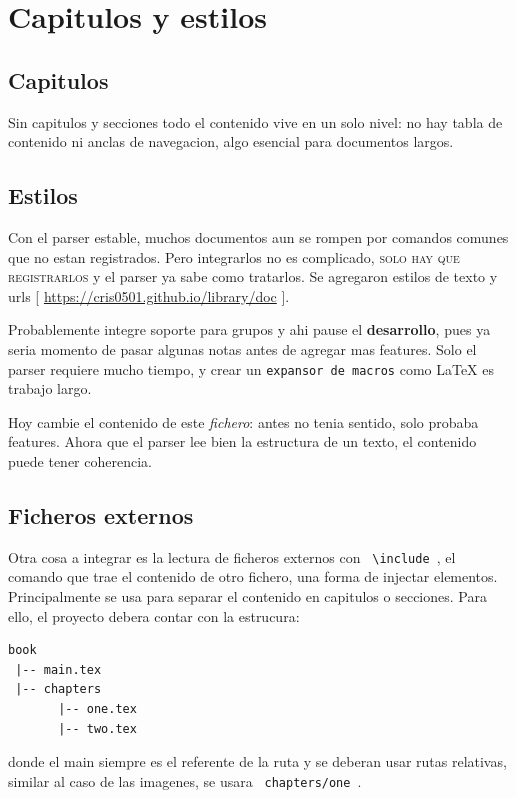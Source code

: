 \documentclass{article}
\begin{document}
  \chapter{ Capitulos y estilos }

  \section{ Capitulos }

  Sin capitulos y secciones todo el contenido vive en un solo nivel: no hay
  tabla de contenido ni anclas de navegacion, algo esencial para documentos largos.

  \section{ Estilos }

  Con el parser estable, muchos documentos aun se rompen por comandos comunes
  que no estan registrados. Pero integrarlos no es complicado, \textsc{solo hay
  que registrarlos} y el parser ya sabe como tratarlos. Se agregaron estilos de
  texto y urls [ \url{https://cris0501.github.io/library/doc} ].

  Probablemente integre soporte para grupos y ahi pause el \textbf{desarrollo},
  pues ya seria momento de pasar algunas notas antes de agregar mas features.
  Solo el parser requiere mucho tiempo, y crear un \texttt{expansor de macros}
  como LaTeX es trabajo largo.

  Hoy cambie el contenido de este \textit{fichero}: antes no tenia sentido,
  solo probaba features. Ahora que el parser lee bien la estructura de un texto,
  el contenido puede tener coherencia.

  \section{ Ficheros externos }
  
  Otra cosa a integrar es la lectura de ficheros externos con \texttt{ \backslash include },
  el comando que trae el contenido de otro fichero, una forma
  de injectar elementos. Principalmente se usa para separar el contenido en capitulos
  o secciones. Para ello, el proyecto debera contar con la estrucura:
  
\begin{verbatim}
book
 |-- main.tex
 |-- chapters
       |-- one.tex
       |-- two.tex
\end{verbatim}

  donde el main siempre es el referente de la ruta y se deberan usar rutas relativas,
  similar al caso de las imagenes, se usara \texttt{ chapters/one }.
\end{document}
